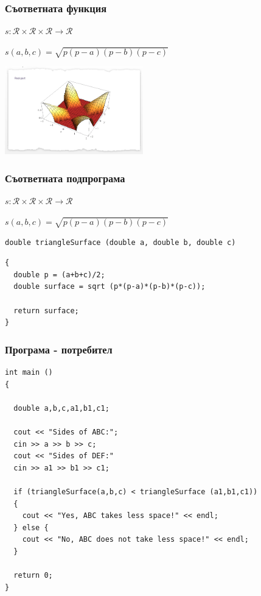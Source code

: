 \documentclass{beamer}
\begin{document}
\begin{frame}[fragile]
\frametitle{Съответната функция}

$s:\mathcal{R}\times\mathcal{R}\times\mathcal{R} \rightarrow \mathcal{R}$


$s(a,b,c)=\sqrt{p(p-a)(p-b)(p-c)}$


\begin{center}
\includegraphics[width=6cm]{images/heron}
\end{center}


\end{frame}
\begin{frame}[fragile]
\frametitle{Съответната подпрограма}

$s:\mathcal{R}\times\mathcal{R}\times\mathcal{R} \rightarrow \mathcal{R}$

$s(a,b,c)=\sqrt{p(p-a)(p-b)(p-c)}$

\pause

\begin{flushleft}
\begin{lstlisting}
double triangleSurface (double a, double b, double c)
\end{lstlisting}\pause\begin{lstlisting}
{
  double p = (a+b+c)/2;
  double surface = sqrt (p*(p-a)*(p-b)*(p-c));

  return surface;
}
\end{lstlisting}
\end{flushleft}


\end{frame}

\begin{frame}[fragile]
\frametitle{Програма - потребител}

\begin{flushleft}
\begin{lstlisting}
int main ()
{

  double a,b,c,a1,b1,c1;

  cout << "Sides of ABC:";
  cin >> a >> b >> c;
  cout << "Sides of DEF:"
  cin >> a1 >> b1 >> c1;

  if (triangleSurface(a,b,c) < triangleSurface (a1,b1,c1))
  {
    cout << "Yes, ABC takes less space!" << endl;
  } else {
    cout << "No, ABC does not take less space!" << endl;
  }

  return 0;
}
\end{lstlisting}
\end{flushleft}


\end{frame}
\end{document}
